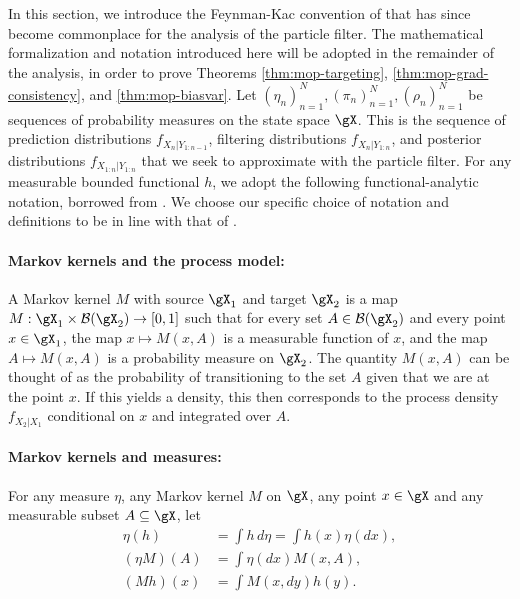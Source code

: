 

In this section, we introduce the Feynman-Kac convention of \cite{delMoral04} that has since become commonplace \citep{karjalainen23} for the analysis of the particle filter. The mathematical formalization and notation introduced here will be adopted in the remainder of the analysis, in order to prove Theorems \ref{thm:mop-targeting}, \ref{thm:mop-grad-consistency}, and \ref{thm:mop-biasvar}. Let $(\eta_n)_{n=1}^N, (\pi_n)_{n=1}^N, (\rho_n)_{n=1}^N$ be sequences of probability measures on the state space $\gX$. This is the sequence of prediction distributions $f_{X_{n}|Y_{1:n-1}}$, filtering distributions $f_{X_{n}|Y_{1:n}}$, and posterior distributions $f_{X_{1:n}|Y_{1:n}}$ that we seek to approximate with the particle filter. For any measurable bounded functional $h$, we adopt the following functional-analytic notation, borrowed from \cite{delMoral04, chopin20, karjalainen23}. We choose our specific choice of notation and definitions to be in line with that of \cite{karjalainen23}. 


\paragraph{\bf Markov kernels and the process model:} A Markov kernel $M$ with source $\gX_1$ and target $\gX_2$ is a map $M: \gX_1 \times \mathcal{B}(\gX_2) \to [0,1]$ such that for every set $A \in \mathcal{B}(\gX_2)$ and every point $x \in \gX_1$, the map $x \mapsto M(x, A)$ is a measurable function of $x$, and the map $A \mapsto M(x,A)$ is a probability measure on $\gX_2$. The quantity $M(x,A)$ can be thought of as the probability of transitioning to the set $A$ given that we are at the point $x$. If this yields a density, this then corresponds to the process density $f_{X_{2}|X_1}$ conditional on $x$ and integrated over $A$.  

\paragraph{\bf Markov kernels and measures:} For any measure $\eta$, any Markov kernel $M$ on $\gX$, any point $x \in \gX$ and any measurable subset $A \subseteq \gX$, let 
\begin{align}
    \eta(h) &= \int h \, d\eta = \int h(x) \eta(dx), \\(\eta M)(A) &= \int \eta(dx)M(x,A), \\
    (Mh)(x) &= \int M(x, dy) h(y).
\end{align}


